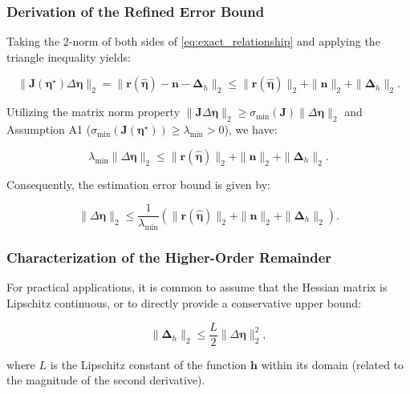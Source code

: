 \documentclass[journal]{IEEEtran}
\begin{document}
\subsubsection{Derivation of the Refined Error Bound}
Taking the 2-norm of both sides of \eqref{eq:exact_relationship} and applying the triangle inequality yields:

\begin{equation}
\|\mathbf{J}(\boldsymbol{\eta}^\star)\Delta\boldsymbol{\eta}\|_2 = \|\mathbf{r}(\hat{\boldsymbol{\eta}}) - \mathbf{n} - \boldsymbol{\Delta}_h\|_2 \leq \|\mathbf{r}(\hat{\boldsymbol{\eta}})\|_2 + \|\mathbf{n}\|_2 + \|\boldsymbol{\Delta}_h\|_2.
\label{eq:norm_inequality}
\end{equation}

Utilizing the matrix norm property $\|\mathbf{J}\Delta\boldsymbol{\eta}\|_2 \geq \sigma_{\min}(\mathbf{J})\|\Delta\boldsymbol{\eta}\|_2$ and Assumption A1 ($\sigma_{\min}(\mathbf{J}(\boldsymbol{\eta}^\star)) \geq \lambda_{\min} > 0$), we have:

\begin{equation}
\lambda_{\min} \|\Delta\boldsymbol{\eta}\|_2 \leq \|\mathbf{r}(\hat{\boldsymbol{\eta}})\|_2 + \|\mathbf{n}\|_2 + \|\boldsymbol{\Delta}_h\|_2.
\label{eq:intermediate_bound_refined}
\end{equation}

Consequently, the estimation error bound is given by:

\begin{equation}
\boxed{\|\Delta\boldsymbol{\eta}\|_2 \leq \frac{1}{\lambda_{\min}} \left( \|\mathbf{r}(\hat{\boldsymbol{\eta}})\|_2 + \|\mathbf{n}\|_2 + \|\boldsymbol{\Delta}_h\|_2 \right)}.
\label{eq:error_bound_with_remainder}
\end{equation}

\subsubsection{Characterization of the Higher-Order Remainder}
For practical applications, it is common to assume that the Hessian matrix is Lipschitz continuous, or to directly provide a conservative upper bound:

\begin{equation}
\|\boldsymbol{\Delta}_h\|_2 \leq \frac{L}{2} \|\Delta\boldsymbol{\eta}\|_2^2,
\label{eq:remainder_bound}
\end{equation}

where $L$ is the Lipschitz constant of the function $\mathbf{h}$ within its domain (related to the magnitude of the second derivative).
\end{document}
